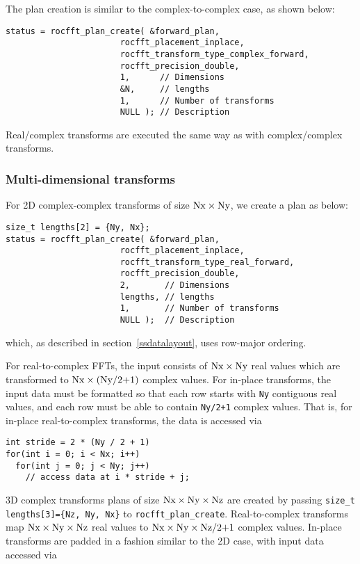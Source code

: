 \documentclass[10pt]{article}
\renewcommand{\(}{\left(}
\renewcommand{\)}{\right)}
\begin{document}
The plan creation is similar to the complex-to-complex case, as shown
below:
\begin{lstlisting}
status = rocfft_plan_create( &forward_plan,
                       rocfft_placement_inplace,
                       rocfft_transform_type_complex_forward,
                       rocfft_precision_double,
                       1,      // Dimensions
                       &N,     // lengths
                       1,      // Number of transforms
                       NULL ); // Description
\end{lstlisting}
Real/complex transforms are executed the same way as with
complex/complex transforms.

\subsubsection{Multi-dimensional transforms}

For 2D complex-complex transforms of size
$\text{\lstinline{Nx}}\times\text{\lstinline{Ny}}$, we create a plan
as below:
\begin{lstlisting}
size_t lengths[2] = {Ny, Nx};
status = rocfft_plan_create( &forward_plan,
                       rocfft_placement_inplace,
                       rocfft_transform_type_real_forward,
                       rocfft_precision_double,
                       2,       // Dimensions
                       lengths, // lengths
                       1,       // Number of transforms
                       NULL );  // Description
\end{lstlisting}
which, as described in section~\ref{ssdatalayout}, uses row-major
ordering.

For real-to-complex FFTs, the input consists of
$\text{\lstinline{Nx}}\times\text{\lstinline{Ny}}$ real values which
are transformed to
$\text{\lstinline{Nx}}\times(\text{\lstinline{Ny/2+1}})$ complex
values.  For in-place transforms, the input data must be formatted so
that each row starts with \lstinline{Ny} contiguous real values, and
each row must be able to contain \lstinline{Ny/2+1} complex values.
That is, for in-place real-to-complex transforms, the data is accessed
via
\begin{lstlisting}
int stride = 2 * (Ny / 2 + 1)
for(int i = 0; i < Nx; i++)
  for(int j = 0; j < Ny; j++)
    // access data at i * stride + j;
\end{lstlisting}

3D complex transforms plans of size
$\text{\lstinline{Nx}}\times\text{\lstinline{Ny}}\times\text{\lstinline{Nz}}$
are created by passing \lstinline|size_t lengths[3]={Nz, Ny, Nx}| to
\lstinline{rocfft_plan_create}.  Real-to-complex transforms map
$\text{\lstinline{Nx}}\times\text{\lstinline{Ny}}\times\text{\lstinline{Nz}}$
real values to
$\text{\lstinline{Nx}}\times\text{\lstinline{Ny}}\times\text{\lstinline{Nz/2+1}}$
complex values.  In-place transforms are padded in a fashion similar
to the 2D case, with input data accessed via
\end{document}
